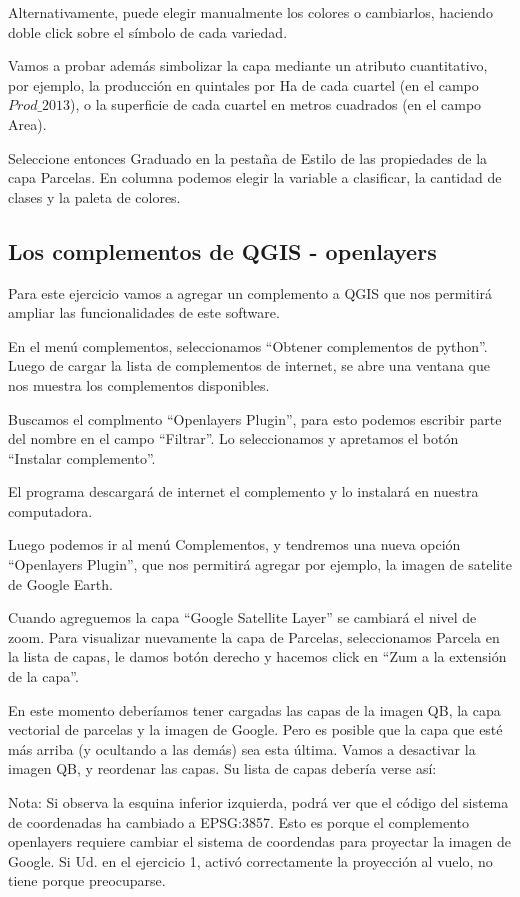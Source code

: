 \documentclass[]{article}
\begin{document}
Alternativamente, puede elegir manualmente los colores o cambiarlos, haciendo doble click sobre el símbolo de cada variedad.

Vamos a probar además simbolizar la capa mediante un atributo cuantitativo, por ejemplo, la producción en quintales por Ha de cada cuartel (en el campo $Prod\_2013$), o la superficie de cada cuartel en metros cuadrados (en el campo Area).

Seleccione entonces Graduado en la pestaña de Estilo de las propiedades de la capa Parcelas. En columna podemos elegir la variable a clasificar, la cantidad de clases y la paleta de colores.

\subsection{Los complementos de QGIS - openlayers}

Para este ejercicio vamos a agregar un complemento a QGIS que nos permitirá ampliar las funcionalidades de este software.

En el menú complementos, seleccionamos “Obtener complementos de python”.  Luego de cargar la lista de complementos de internet, se abre una ventana que nos muestra los complementos disponibles.

Buscamos el complmento “Openlayers Plugin”, para esto podemos escribir parte del nombre en el campo “Filtrar”. Lo seleccionamos y apretamos el botón “Instalar complemento”.

El programa descargará de internet el complemento y lo instalará en nuestra computadora. 

Luego podemos ir al menú Complementos, y tendremos una nueva opción “Openlayers Plugin”, que nos permitirá agregar por ejemplo, la imagen de satelite de Google Earth.


Cuando agreguemos la capa “Google Satellite Layer” se cambiará el nivel de zoom. Para visualizar nuevamente la capa de Parcelas, seleccionamos Parcela en la lista de capas, le damos botón derecho y hacemos click en “Zum a la extensión de la capa”.

En este momento deberíamos tener cargadas las capas de la imagen QB, la capa vectorial de parcelas y la imagen de Google. Pero es posible que la capa que esté más arriba (y ocultando a las demás) sea esta última. Vamos a desactivar la imagen QB, y reordenar las capas. Su lista de capas debería verse así:


Nota: Si observa la esquina inferior izquierda, podrá ver que el código del sistema de coordenadas ha cambiado a EPSG:3857. Esto es porque el complemento openlayers requiere cambiar el sistema de coordendas para proyectar la imagen de Google. Si Ud. en el ejercicio 1, activó correctamente la proyección al vuelo, no tiene porque preocuparse. 
\end{document}
